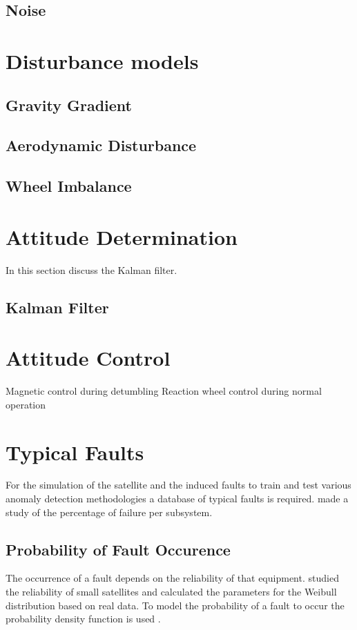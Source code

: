 \subsection{Noise}

\section{Disturbance models}
\subsection{Gravity Gradient}

\subsection{Aerodynamic Disturbance}
\cite{Steyn2014}

\subsection{Wheel Imbalance}

\section{Attitude Determination}
In this section discuss the Kalman filter.

\subsection{Kalman Filter}
\cite{Jones2017}

\section{Attitude Control}
Magnetic control during detumbling
Reaction wheel control during normal operation

\section{Typical Faults}
For the simulation of the satellite and the induced faults to train and test various anomaly detection methodologies a database of typical faults is required. \textcite{tafazoli2009study} made a study of the percentage of failure per subsystem. 

\subsection{Probability of Fault Occurence}
The occurrence of a fault depends on the reliability of that equipment. \textcite{Guo2014} studied the reliability of small satellites and calculated the parameters for the Weibull distribution based on real data. To model the probability of a fault to occur the probability density function is used \cite{Jones2017}.

